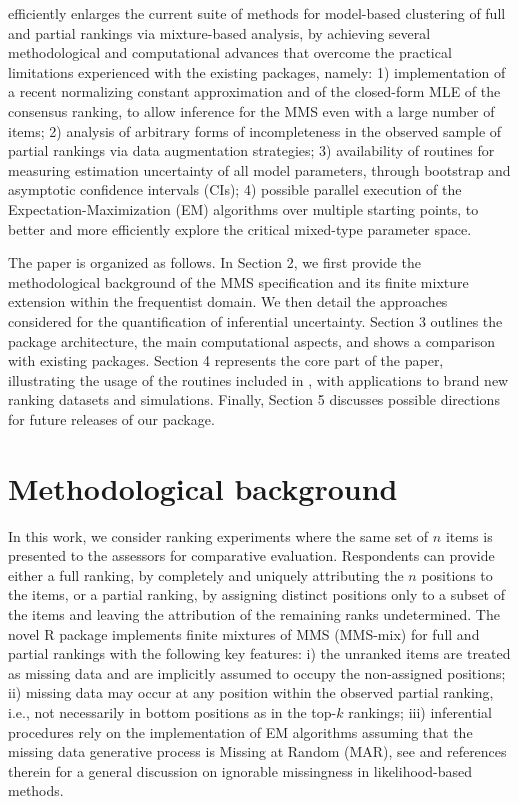  efficiently enlarges the current suite of methods for model-based clustering of full and partial rankings via mixture-based analysis, by achieving several methodological and computational advances that overcome the practical limitations experienced with the existing packages, namely: 1) implementation of a recent normalizing constant approximation and of the closed-form MLE of the consensus ranking, to allow inference for the MMS even with a large number of items; 2) analysis of arbitrary forms of incompleteness in the observed sample of partial rankings via data augmentation strategies; 3) availability of routines for measuring estimation uncertainty of all model parameters, through bootstrap and asymptotic confidence intervals (CIs); 4) possible parallel execution of the Expectation-Maximization (EM) algorithms over multiple starting points, to better and more efficiently explore the critical mixed-type parameter space.

The paper is organized as follows. In Section
2, we first provide the methodological background of the MMS specification and its finite mixture extension within the frequentist domain. We then detail the approaches considered for the quantification of inferential uncertainty. Section 3 outlines the package architecture, the main computational aspects, and shows a comparison with existing packages.  Section
4 represents the core part of the paper, illustrating the usage of the routines included in , with applications to brand new ranking datasets and simulations.
Finally, Section
5 discusses possible directions for future releases of our package.

\section{Methodological background}
\label{sec:background}

In this work, we consider ranking experiments where the same set of $n$ items is presented to the assessors for comparative evaluation. Respondents can provide either a full ranking, by completely and uniquely attributing the $n$ positions to the items, or a partial ranking, by assigning distinct positions only to a subset of the items and leaving the attribution of the remaining ranks undetermined. The novel \textsf{R} package  implements finite mixtures of MMS (MMS-mix) for full and partial rankings with the following key features: i) the unranked items are treated as missing data and are implicitly assumed to occupy the non-assigned positions; ii) missing data may occur at any position within the observed partial ranking, i.e., not necessarily in bottom positions as in the top-$k$ rankings; iii) inferential procedures rely on the implementation of EM algorithms assuming that the missing data generative process is Missing at Random (MAR),
see \cite{little2011calibrated} and references therein for a general discussion on ignorable missingness in likelihood-based methods.

